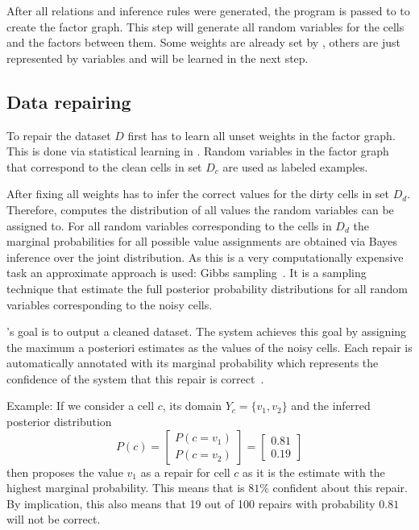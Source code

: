   \bigskip
  After all relations and inference rules were generated, the \ddlog{} program is passed to \deepdive{} to create the factor graph.
  This step will generate all random variables for the cells and the factors between them.
  Some weights are already set by \holoclean{}, others are just represented by variables and will be learned in the next step.
  
  \subsection{Data repairing}\label{sec:repairing}
  To repair the dataset $D$ \holoclean{} first has to learn all unset weights in the factor graph.
  This is done via statistical learning in \deepdive{}.
  Random variables in the factor graph that correspond to the clean cells in set $D_c$ are used as labeled examples.
  
  After fixing all weights \holoclean{} has to infer the correct values for the dirty cells in set $D_d$.
  Therefore, \holoclean{} computes the distribution of all values the random variables can be assigned to.
  For all random variables corresponding to the cells in $D_d$ the marginal probabilities for all possible value assignments are obtained via Bayes inference over the joint distribution.
  As this is a very computationally expensive task an approximate approach is used: Gibbs sampling~\cite{gibbssampling}.
  It is a sampling technique that estimate the full posterior probability distributions for all random variables corresponding to the noisy cells.
  
  \holoclean{}'s goal is to output a cleaned dataset.
  The system achieves this goal by assigning the maximum a posteriori estimates as the values of the noisy cells.
  Each repair is automatically annotated with its marginal probability which represents the confidence of the system that this repair is correct~\cite{holoclean}. 
  
  Example: If we consider a cell $c$, its domain $Y_c=\{v_1, v_2\}$ and the inferred posterior distribution
  \begin{equation}
    P(c) =
    \begin{bmatrix}
      P(c = v_1)\\
      P(c = v_2)
    \end{bmatrix} = 
    \begin{bmatrix}
      0.81\\
      0.19
    \end{bmatrix}
  \end{equation}
  then \holoclean{} proposes the value $v_1$ as a repair for cell $c$ as it is the estimate with the highest marginal probability.
  This means that \holoclean{} is $81\%$ confident about this repair.
  By implication, this also means that 19 out of 100 repairs with probability $0.81$ will not be correct.

